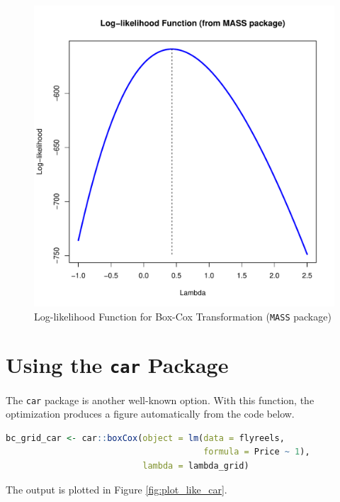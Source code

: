 \documentclass[11pt]{book}
\begin{document}
\begin{figure}[h!]
  \centering
  \includegraphics[scale = 0.5, keepaspectratio=true]{../Figures/plot_like_MASS}
  \caption{Log-likelihood Function for Box-Cox Transformation (\texttt{MASS} package)} \label{fig:plot_like_MASS}
\end{figure}


\clearpage
\section*{Using the \texttt{car} Package}

The \texttt{car} package is another well-known option.
With this function, the optimization produces 
a figure automatically from the code below.

\begin{lstlisting}[language=R]
bc_grid_car <- car::boxCox(object = lm(data = flyreels,
                                       formula = Price ~ 1),
                           lambda = lambda_grid)
\end{lstlisting}

The output is plotted in Figure \ref{fig:plot_like_car}.
\end{document}
